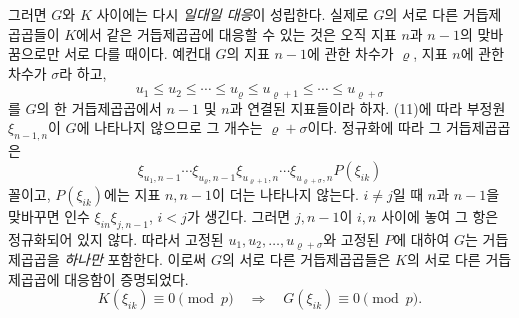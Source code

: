 그러면 \(G\)와 \(K\) 사이에는 다시 \emph{일대일 대응}이 성립한다. 실제로 \(G\)의 서로 다른 거듭제곱곱들이 \(K\)에서 같은 거듭제곱곱에 대응할 수 있는 것은 오직 지표 \(n\)과 \(n-1\)의 맞바꿈으로만 서로 다를 때이다. 예컨대 \(G\)의 지표 \(n-1\)에 관한 차수가 \(\varrho\), 지표 \(n\)에 관한 차수가 \(\sigma\)라 하고,
\[
u_1\le u_2\le\cdots\le u_\varrho
\le u_{\varrho+1}\le\cdots\le u_{\varrho+\sigma}
\]
를 \(G\)의 한 거듭제곱곱에서 \(n-1\) 및 \(n\)과 연결된 지표들이라 하자. (11)에 따라 부정원 \(\xi_{n-1,n}\)이 \(G\)에 나타나지 않으므로 그 개수는 \(\varrho+\sigma\)이다. 정규화에 따라 그 거듭제곱곱은
\[
\xi_{u_1,n-1}\cdots\xi_{u_\varrho,n-1}
\xi_{u_{\varrho+1},n}\cdots\xi_{u_{\varrho+\sigma},n}
P(\xi_{ik})
\]
꼴이고, \(P(\xi_{ik})\)에는 지표 \(n,n-1\)이 더는 나타나지 않는다. \(i\ne j\)일 때 \(n\)과 \(n-1\)을 맞바꾸면 인수 \(\xi_{in}\xi_{j,n-1}\), \(i<j\)가 생긴다. 그러면 \(j,n-1\)이 \(i,n\) 사이에 놓여 그 항은 정규화되어 있지 않다. 따라서 고정된 \(u_1,u_2,\ldots,u_{\varrho+\sigma}\)와 고정된 \(P\)에 대하여 \(G\)는 거듭제곱곱을 \emph{하나만} 포함한다. 이로써 \(G\)의 서로 다른 거듭제곱곱들은 \(K\)의 서로 다른 거듭제곱곱에 대응함이 증명되었다.
\begin{equation}
\tag{13}
K(\xi_{ik})\equiv0\pmod p
\quad\Longrightarrow\quad
G(\xi_{ik})\equiv0\pmod p.
\end{equation}

